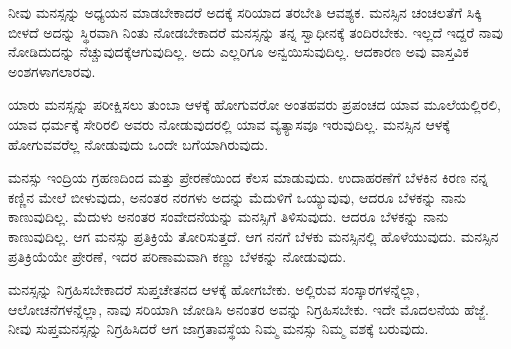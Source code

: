 ನೀವು ಮನಸ್ಸನ್ನು ಅಧ್ಯಯನ ಮಾಡಬೇಕಾದರೆ ಅದಕ್ಕೆ ಸರಿಯಾದ ತರಬೇತಿ ಆವಶ್ಯಕ. ಮನಸ್ಸಿನ ಚಂಚಲತೆಗೆ ಸಿಕ್ಕಿ ಬೀಳದೆ ಅದನ್ನು ಸ್ಥಿರವಾಗಿ ನಿಂತು ನೋಡಬೇಕಾದರೆ ಮನಸ್ಸನ್ನು ತನ್ನ ಸ್ವಾಧೀನಕ್ಕೆ ತಂದಿರಬೇಕು. ಇಲ್ಲದೆ ಇದ್ದರೆ ನಾವು ನೋಡಿದುದನ್ನು ನೆಚ್ಚುವುದಕ್ಕೆ\break ಆಗುವುದಿಲ್ಲ. ಅದು ಎಲ್ಲರಿಗೂ ಅನ್ವಯಿಸುವುದಿಲ್ಲ. ಆದಕಾರಣ ಅವು ವಾಸ್ತವಿಕ ಅಂಶಗಳಾಗಲಾರವು.

ಯಾರು ಮನಸ್ಸನ್ನು ಪರೀಕ್ಷಿಸಲು ತುಂಬಾ ಆಳಕ್ಕೆ ಹೋಗುವರೋ ಅಂತಹವರು ಪ್ರಪಂಚದ ಯಾವ ಮೂಲೆಯಲ್ಲಿರಲಿ, ಯಾವ ಧರ್ಮಕ್ಕೆ ಸೇರಿರಲಿ ಅವರು ನೋಡುವುದರಲ್ಲಿ ಯಾವ ವ್ಯತ್ಯಾಸವೂ ಇರುವುದಿಲ್ಲ. ಮನಸ್ಸಿನ ಆಳಕ್ಕೆ ಹೋಗುವವರೆಲ್ಲ ನೋಡುವುದು ಒಂದೇ ಬಗೆಯಾಗಿರುವುದು.

ಮನಸ್ಸು ಇಂದ್ರಿಯ ಗ್ರಹಣದಿಂದ ಮತ್ತು ಪ್ರೇರಣೆಯಿಂದ ಕೆಲಸ ಮಾಡುವುದು. ಉದಾಹರಣೆಗೆ ಬೆಳಕಿನ ಕಿರಣ ನನ್ನ ಕಣ್ಣಿನ ಮೇಲೆ ಬೀಳುವುದು, ಅನಂತರ ನರಗಳು ಅದನ್ನು ಮೆದುಳಿಗೆ ಒಯ್ಯುವುವು, ಆದರೂ ಬೆಳಕನ್ನು ನಾನು ಕಾಣುವುದಿಲ್ಲ. ಮೆದುಳು ಅನಂತರ ಸಂವೇದನೆಯನ್ನು ಮನಸ್ಸಿಗೆ ತಿಳಿಸುವುದು. ಆದರೂ ಬೆಳಕನ್ನು ನಾನು ಕಾಣುವುದಿಲ್ಲ. ಆಗ ಮನಸ್ಸು ಪ್ರತಿಕ್ರಿಯೆ ತೋರಿಸುತ್ತದೆ. ಆಗ ನನಗೆ ಬೆಳಕು ಮನಸ್ಸಿನಲ್ಲಿ ಹೊಳೆಯುವುದು. ಮನಸ್ಸಿನ ಪ್ರತಿಕ್ರಿಯೆಯೇ ಪ್ರೇರಣೆ, ಇದರ ಪರಿಣಾಮವಾಗಿ ಕಣ್ಣು ಬೆಳಕನ್ನು ನೋಡುವುದು.

ಮನಸ್ಸನ್ನು ನಿಗ್ರಹಿಸಬೇಕಾದರೆ ಸುಪ್ತಚೇತನದ ಆಳಕ್ಕೆ ಹೋಗಬೇಕು. ಅಲ್ಲಿರುವ ಸಂಸ್ಕಾರಗಳನ್ನೆಲ್ಲಾ, ಆಲೋಚನೆಗಳನ್ನೆಲ್ಲಾ, ನಾವು ಸರಿಯಾಗಿ ಜೋಡಿಸಿ ಅನಂತರ ಅವನ್ನು ನಿಗ್ರಹಿಸಬೇಕು. ಇದೇ ಮೊದಲನೆಯ ಹೆಜ್ಜೆ. ನೀವು ಸುಪ್ತಮನಸ್ಸನ್ನು ನಿಗ್ರಹಿಸಿದರೆ ಆಗ ಜಾಗ್ರತಾವಸ್ಥೆಯ ನಿಮ್ಮ ಮನಸ್ಸು ನಿಮ್ಮ ವಶಕ್ಕೆ ಬರುವುದು.

